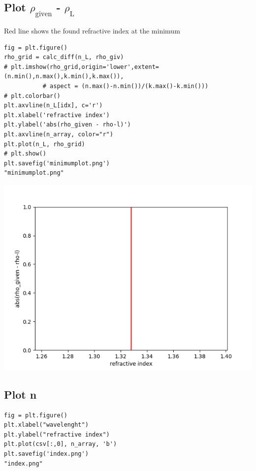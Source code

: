 \documentclass[11pt]{article}
\begin{document}
\subsection{Plot \(\rho_{\text{given}}\) - \(\rho_{\text{L}}\)}
\label{sec:org853a9da}

Red line shows the found refractive index at the minimum 

\begin{verbatim}
fig = plt.figure()
rho_grid = calc_diff(n_L, rho_giv)
# plt.imshow(rho_grid,origin='lower',extent=(n.min(),n.max(),k.min(),k.max()),
           # aspect = (n.max()-n.min())/(k.max()-k.min()))
# plt.colorbar()
plt.axvline(n_L[idx], c='r')
plt.xlabel('refractive index')
plt.ylabel('abs(rho_given - rho-l)')
plt.axvline(n_array, color="r")
plt.plot(n_L, rho_grid)
# plt.show()
plt.savefig('minimumplot.png') 
"minimumplot.png"
\end{verbatim}

\begin{center}
\includegraphics[width=.9\linewidth]{minimumplot.png}
\end{center}

\subsection{Plot n}
\label{sec:orgd80064e}

\begin{verbatim}
fig = plt.figure()
plt.xlabel("wavelenght")
plt.ylabel("refractive index")
plt.plot(csv[:,0], n_array, 'b')
plt.savefig('index.png') 
"index.png"
\end{verbatim}
\end{document}

